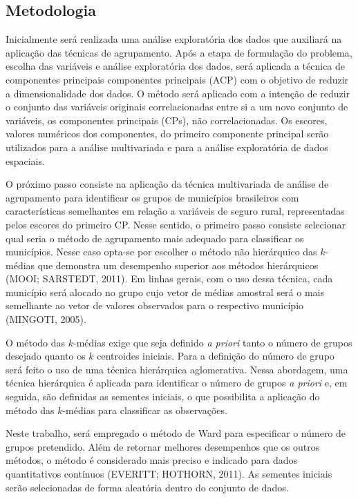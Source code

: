 \documentclass[12pt, a4paper,brazil,oneside]{article}
\begin{document}
	\subsection{Metodologia}
	
	Inicialmente será realizada uma análise exploratória dos dados que auxiliará na aplicação das técnicas de agrupamento. Após a etapa de formulação do problema, escolha das variáveis e análise exploratória dos dados, será aplicada a técnica de componentes principais componentes principais (ACP) com o objetivo de reduzir a dimensionalidade dos dados. O método será aplicado com a intenção de reduzir o conjunto das variáveis originais correlacionadas entre si a um novo conjunto de variáveis, os componentes principais (CPs), não correlacionadas. Os escores, valores numéricos dos componentes, do primeiro componente principal serão utilizados para a análise multivariada e para a análise exploratória de dados espaciais. 
	
	O próximo passo consiste na aplicação da técnica multivariada de análise de agrupamento para identificar os grupos de municípios brasileiros com características semelhantes em relação a variáveis de seguro rural, representadas 	pelos escores do primeiro CP. Nesse sentido, o primeiro passo consiste selecionar qual seria o método de agrupamento mais adequado para classificar os municípios. Nesse caso opta-se por escolher o método não hierárquico das $k$-médias que demonstra um desempenho superior aos métodos hierárquicos (MOOI; SARSTEDT, 2011). Em linhas gerais, com o uso dessa técnica, cada município será alocado no grupo cujo vetor de médias amostral será o mais semelhante ao vetor de valores observados para o respectivo município (MINGOTI, 2005).
	
	O método das $k$-médias exige que seja definido \textit{a priori} tanto o número de grupos desejado quanto os $k$ centroides iniciais. Para a definição do número de grupo será feito o uso de uma técnica hierárquica aglomerativa. Nessa abordagem, uma técnica hierárquica é aplicada para identificar o número de grupos \textit{a priori} e, em seguida, são definidas as sementes iniciais, o que possibilita a aplicação do método das $k$-médias para classificar as observações.
	
	Neste trabalho, será empregado o método de Ward para especificar o número de grupos pretendido. Além de retornar melhores desempenhos que os outros  métodos, o método é considerado mais preciso e indicado para dados quantitativos contínuos (EVERITT; HOTHORN, 2011). As sementes iniciais serão selecionadas de forma aleatória dentro do conjunto de dados.
	
\end{document}
